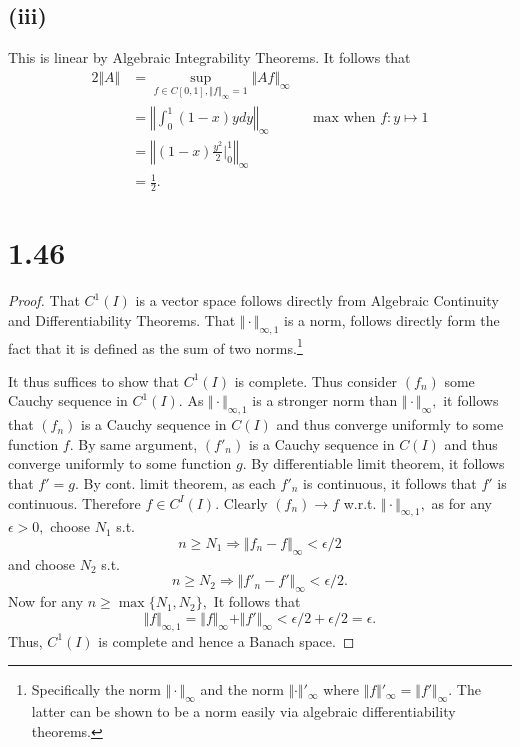 \documentclass[10pt]{article}
\begin{document}
\subsection*{(iii)} This is linear by Algebraic Integrability Theorems. It follows that
\begin{alignat*}{2}
    \Vert A \Vert &= \sup_{f\in C[0,1],\Vert f\Vert_\infty=1}  \Vert Af\Vert_\infty\\
    &=\left \Vert\int_{0}^{1}(1-x)ydy\right \Vert_\infty\ &&\text{max when $f:y\mapsto 1$}\\
    &= \left\Vert(1-x)\frac{y^2}{2}\bigg |_0^1\right\Vert_\infty\\
    &= \frac{1}{2}.
\end{alignat*}

\section*{1.46}
 \begin{proof}
    That $C^1(I)$ is a vector space follows directly from Algebraic Continuity and Differentiability Theorems. That $\Vert\cdot\Vert_{\infty,1}$ is a norm, follows directly form the fact that it is defined as the sum of two norms.\footnote{Specifically the norm $\Vert \cdot\Vert_\infty$ and the norm $\Vert \cdot \Vert'_\infty$ where $\Vert f\Vert'_\infty = \Vert f' \Vert_\infty.$ The latter can be shown to be a norm easily via algebraic differentiability theorems.}

    It thus suffices to show that $C^1(I)$ is complete. Thus consider $(f_n)$ some Cauchy sequence in $C^1(I).$ As $\Vert\cdot\Vert_{\infty,1}$ is a stronger norm than $\Vert \cdot\Vert_\infty,$ it follows that $(f_n)$ is a Cauchy sequence in $C(I)$ and thus converge uniformly to some function $f.$ By same argument, $(f'_n)$ is a Cauchy sequence in $C(I)$ and thus converge uniformly to some function $g.$ By differentiable limit theorem, it follows that $f' =g.$ By cont. limit theorem, as each $f'_n$ is continuous, it follows that $f'$ is continuous. Therefore $f\in C^I(I).$ Clearly $(f_n)\to f$ w.r.t. $\Vert\cdot\Vert_{\infty,1},$ as for any $\epsilon>0,$ choose $N_1$ s.t.
    \[n\ge N_1 \Rightarrow \Vert f_n-f\Vert_\infty < \epsilon/2\]
    and choose $N_2$ s.t.
    \[n\ge N_2 \Rightarrow \Vert f'_n-f'\Vert_\infty < \epsilon/2.\]
    Now for any $n\ge \max\{N_1,N_2\},$ It follows that
    \[\Vert f\Vert_{\infty,1}=\Vert f\Vert_\infty+\Vert f'\Vert_\infty<\epsilon/2+\epsilon/2=\epsilon.\]
    Thus, $C^1(I)$ is complete and hence a Banach space.
 \end{proof}
\end{document}
